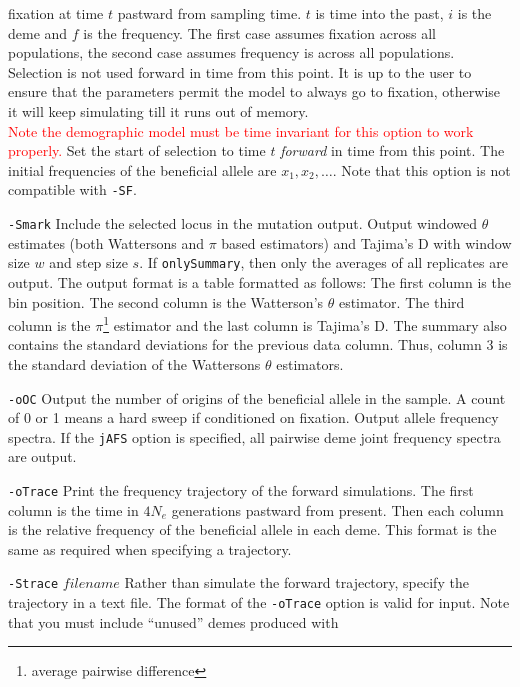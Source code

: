 \documentclass{article}
\begin{document}
\begin{eqlist*}
fixation at time $t$ pastward from sampling time. $t$ is time into the past,
$i$ is the deme and $f$ is the frequency. The first case assumes fixation
across all populations, the second case assumes frequency is across all
populations. Selection is not used forward in time from this point. It is up to
the user to ensure that the parameters permit the model to always go to
fixation,  otherwise it will keep simulating till it runs out of memory. \\
\textcolor{red}{ Note the demographic model must be time invariant for this option to work properly.}
 Set the start of selection to
time $t$ {\em forward} in time from this point. The initial frequencies of the
beneficial allele are $x_1,x_2,\ldots$. Note that this option is not compatible with
{\tt -SF}.
\item[{\tt -Smark}] Include the selected locus in the mutation output. 
\longitem[{\tt -oTPi} $w$ $s$ {\tt [onlySummary]}] Output windowed 
$\theta$ estimates (both Wattersons and $\pi$ based estimators) and Tajima's D
with window size $w$ and step size $s$. If {\tt onlySummary}, then only the
averages of all replicates are output. The output format is a table formatted as follows:
The first column is the bin position. The second column is the Watterson's
$\theta$ estimator. The third column is the $\pi$\footnote{average pairwise
difference} estimator and the last column is Tajima's D. The summary also
contains the standard deviations for the previous data column. Thus, column 3 is
the standard deviation of the Wattersons $\theta$ estimators. 
\item[{\tt -oOC}] Output the number of origins of the beneficial allele in the
sample. A count of 0 or 1 means a hard sweep if conditioned on fixation. 
\longitem[{-tt -oAFS} {\tt [jAFS]} {\tt [onlySummary]} ] Output allele  
frequency spectra. If the {\tt jAFS} option is specified, all pairwise deme
joint frequency spectra are output.
\item[{\tt -oTrace}] Print the frequency trajectory of the forward
simulations. The first column is the time in $4N_e$ generations pastward from
present. Then each column is the relative frequency of the beneficial allele in
each deme. This format is the same as required when specifying a trajectory. 
\item[{\tt -Strace} $filename$] Rather than simulate the forward trajectory,
specify the trajectory in a text file. The format of the {\tt -oTrace} option
is valid for input. Note that you must include ``unused'' demes produced with

\end{eqlist*}
\end{document}
